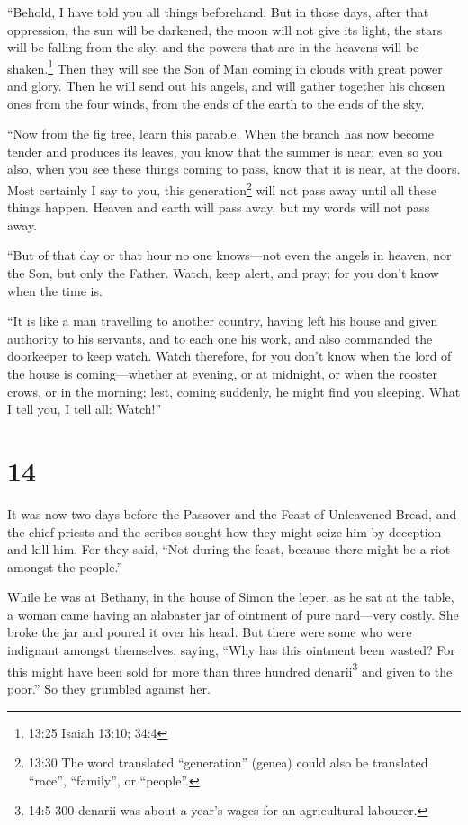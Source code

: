 ``Behold, I have told you all things beforehand.  But in
those days, after that oppression, the sun will be darkened, the moon
will not give its light,  the stars will be falling from
the sky, and the powers that are in the heavens will be
shaken.\footnote{13:25 Isaiah 13:10; 34:4}  Then they will
see the Son of Man coming in clouds with great power and glory.
 Then he will send out his angels, and will gather together
his chosen ones from the four winds, from the ends of the earth to the
ends of the sky.

 ``Now from the fig tree, learn this parable. When the
branch has now become tender and produces its leaves, you know that the
summer is near;  even so you also, when you see these
things coming to pass, know that it is near, at the doors. 
Most certainly I say to you, this generation\footnote{13:30 The word
  translated ``generation'' (genea) could also be translated ``race'',
  ``family'', or ``people''.} will not pass away until all these things
happen.  Heaven and earth will pass away, but my words will
not pass away.

 ``But of that day or that hour no one knows---not even the
angels in heaven, nor the Son, but only the Father.  Watch,
keep alert, and pray; for you don't know when the time is.

 ``It is like a man travelling to another country, having
left his house and given authority to his servants, and to each one his
work, and also commanded the doorkeeper to keep watch. 
Watch therefore, for you don't know when the lord of the house is
coming---whether at evening, or at midnight, or when the rooster crows,
or in the morning;  lest, coming suddenly, he might find
you sleeping.  What I tell you, I tell all: Watch!''

\hypertarget{section-13}{%
\section{14}\label{section-13}}

 It was now two days before the Passover and the Feast of
Unleavened Bread, and the chief priests and the scribes sought how they
might seize him by deception and kill him.  For they said,
``Not during the feast, because there might be a riot amongst the
people.''

 While he was at Bethany, in the house of Simon the leper,
as he sat at the table, a woman came having an alabaster jar of ointment
of pure nard---very costly. She broke the jar and poured it over his
head.  But there were some who were indignant amongst
themselves, saying, ``Why has this ointment been wasted? 
For this might have been sold for more than three hundred
denarii\footnote{14:5 300 denarii was about a year's wages for an
  agricultural labourer.} and given to the poor.'' So they grumbled
against her.

